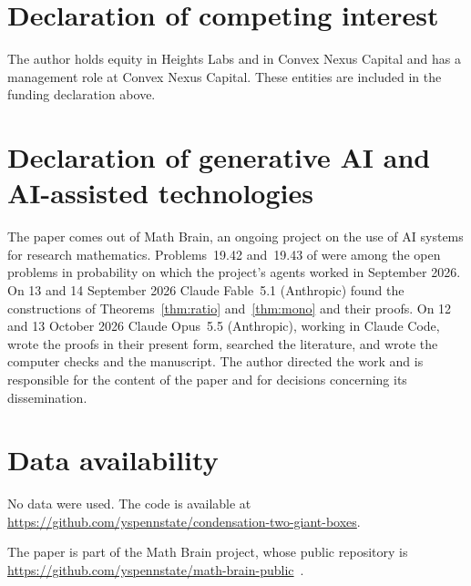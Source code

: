\documentclass[11pt]{amsart}
\theoremstyle{remark}
\numberwithin{equation}{section}
\begin{document}
\section*{Declaration of competing interest}
The author holds equity in Heights Labs and in Convex Nexus Capital and
has a management role at Convex Nexus Capital. These entities are included
in the funding declaration above.

\section*{Declaration of generative AI and AI-assisted technologies}
The paper comes out of Math Brain, an ongoing project on the use of AI systems for research mathematics. Problems~19.42 and~19.43 of \cite{J12} were among the open problems in probability on which the project's agents worked in September 2026. On 13 and 14 September 2026 Claude Fable~5.1 (Anthropic) found the constructions of Theorems~\ref{thm:ratio} and~\ref{thm:mono} and their proofs. On 12 and 13 October 2026 Claude Opus~5.5 (Anthropic), working in Claude Code, wrote the proofs in their present form, searched the literature, and wrote the computer checks and the manuscript. The author directed the work and is responsible for the content of the paper and for decisions concerning its dissemination.

\section*{Data availability}
No data were used. The code is available at\\ \url{https://github.com/yspennstate/condensation-two-giant-boxes}.

The paper is part of the Math Brain project, whose public repository is \url{https://github.com/yspennstate/math-brain-public}~\cite{MathBrainRepo}.
\end{document}
